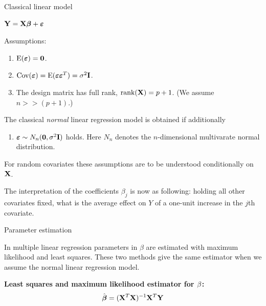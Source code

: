 \documentclass[10pt,ignorenonframetext,]{beamer}
\providecommand{\tightlist}{%
  \setlength{\itemsep}{0pt}\setlength{\parskip}{0pt}}
\begin{document}
\begin{frame}

\begin{block}{Classical linear model}

\({\bf Y=X \boldsymbol\beta}+{\boldsymbol \varepsilon}\)

Assumptions:

\begin{enumerate}
\def\labelenumi{\arabic{enumi}.}
\tightlist
\item
  \(\text{E}(\boldsymbol{\varepsilon})=\bf{0}\).
\item
  \(\text{Cov}(\boldsymbol{\varepsilon})=\text{E}(\boldsymbol{\varepsilon}\boldsymbol{\varepsilon}^T)=\sigma^2\bf{I}\).
\item
  The design matrix has full rank, \(\text{rank}({\bf X})=p+1\). (We
  assume \(n>>(p+1)\).)
\end{enumerate}

The classical \emph{normal} linear regression model is obtained if
additionally

\begin{enumerate}
\def\labelenumi{\arabic{enumi}.}
\setcounter{enumi}{3}
\tightlist
\item
  \(\boldsymbol\varepsilon\sim N_n({\bf 0},\sigma^2 {\bf I})\) holds.
  Here \(N_n\) denotes the \(n\)-dimensional multivarate normal
  distribution.
\end{enumerate}

For random covariates these assumptions are to be understood
conditionally on \({\bf X}\).

The interpretation of the coefficients \(\beta_j\) is now as following:
holding all other covariates fixed, what is the average effect on \(Y\)
of a one-unit increase in the \(j\)th covariate.

\end{block}

\end{frame}

\begin{frame}

\begin{block}{Parameter estimation}

In multiple linear regression parameters in \(\beta\) are estimated with
maximum likelihood and least squares. These two methods give the same
estimator when we assume the normal linear regression model.

\textbf{Least squares and maximum likelihood estimator for
\({\bf \beta}\):}
\[ \hat{\boldsymbol\beta}=({\bf X}^T{\bf X})^{-1} {\bf X}^T {\bf Y}\]

\end{block}

\end{frame}
\end{document}
